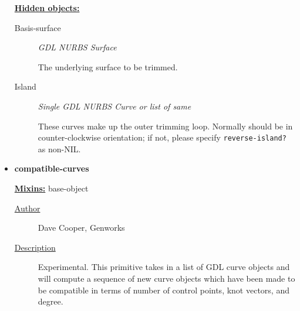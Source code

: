 \documentclass [11pt]{book}
\begin{document}
\begin{itemize}
\textbf{
\underline{Hidden objects:}}

\begin{description}

\item [Basis-surface]
\emph{GDL NURBS Surface}

 The underlying surface to be trimmed.




\item [Island]
\emph{Single GDL NURBS Curve or list of same}

 These curves make up the outer trimming loop. Normally should
be in counter-clockwise orientation; if not, please specify \texttt{reverse-island?} as non-NIL.




\end{description}







\item {}
\label{prim:compatible-curves}
\textbf{compatible-curves}


\textbf{
\underline{Mixins:}} base-object





\begin{description}

\item [
\underline{Author}]


Dave Cooper, Genworks



\item [
\underline{Description}]


Experimental. This primitive takes in a list of GDL 
curve objects and will compute a sequence of new curve objects which have been made 
to be compatible in terms of number of control points, knot vectors, and degree.



\end{description}




\begin{figure}
\begin{lrbox}{\boxedverb}
\begin{minipage}{\linewidth}
{\small

\begin{verbatim}
 

\end{verbatim}}
\end{minipage}
\end{lrbox}
\end{figure}
\end{itemize}
\end{document}
